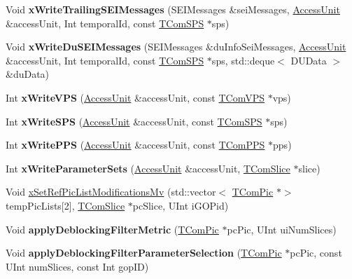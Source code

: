 \begin{DoxyCompactItemize}
Void {\bfseries x\+Write\+Trailing\+S\+E\+I\+Messages} (S\+E\+I\+Messages \&sei\+Messages, \hyperlink{class_access_unit}{Access\+Unit} \&access\+Unit, Int temporal\+Id, const \hyperlink{class_t_com_s_p_s}{T\+Com\+S\+PS} $\ast$sps)
\item 
\mbox{\label{class_t_enc_g_o_p_a90a6aaa451ba2bed29b105229129c70c}} 
Void {\bfseries x\+Write\+Du\+S\+E\+I\+Messages} (S\+E\+I\+Messages \&du\+Info\+Sei\+Messages, \hyperlink{class_access_unit}{Access\+Unit} \&access\+Unit, Int temporal\+Id, const \hyperlink{class_t_com_s_p_s}{T\+Com\+S\+PS} $\ast$sps, std\+::deque$<$ D\+U\+Data $>$ \&du\+Data)
\item 
\mbox{\label{class_t_enc_g_o_p_a5130412b4847fec3413306c5d1bf6554}} 
Int {\bfseries x\+Write\+V\+PS} (\hyperlink{class_access_unit}{Access\+Unit} \&access\+Unit, const \hyperlink{class_t_com_v_p_s}{T\+Com\+V\+PS} $\ast$vps)
\item 
\mbox{\label{class_t_enc_g_o_p_a806897a6da35aa7dc90bcd2288044845}} 
Int {\bfseries x\+Write\+S\+PS} (\hyperlink{class_access_unit}{Access\+Unit} \&access\+Unit, const \hyperlink{class_t_com_s_p_s}{T\+Com\+S\+PS} $\ast$sps)
\item 
\mbox{\label{class_t_enc_g_o_p_a738b979ca624ff502e19d77181a933be}} 
Int {\bfseries x\+Write\+P\+PS} (\hyperlink{class_access_unit}{Access\+Unit} \&access\+Unit, const \hyperlink{class_t_com_p_p_s}{T\+Com\+P\+PS} $\ast$pps)
\item 
\mbox{\label{class_t_enc_g_o_p_ae7de52833a142454d32187ed7bf80b3c}} 
Int {\bfseries x\+Write\+Parameter\+Sets} (\hyperlink{class_access_unit}{Access\+Unit} \&access\+Unit, \hyperlink{class_t_com_slice}{T\+Com\+Slice} $\ast$slice)
\item 
Void \hyperlink{class_t_enc_g_o_p_acdf2285353665293d998ded09e121518}{x\+Set\+Ref\+Pic\+List\+Modifications\+Mv} (std\+::vector$<$ \hyperlink{class_t_com_pic}{T\+Com\+Pic} $\ast$$>$ temp\+Pic\+Lists\mbox{[}2\mbox{]}, \hyperlink{class_t_com_slice}{T\+Com\+Slice} $\ast$pc\+Slice, U\+Int i\+G\+O\+Pid)
\item 
\mbox{\label{class_t_enc_g_o_p_a5f065fcf6c5be1954c9dc8ddadf89b71}} 
Void {\bfseries apply\+Deblocking\+Filter\+Metric} (\hyperlink{class_t_com_pic}{T\+Com\+Pic} $\ast$pc\+Pic, U\+Int ui\+Num\+Slices)
\item 
\mbox{\label{class_t_enc_g_o_p_aaf09a236ed68449451dd0ef6ee2db805}} 
Void {\bfseries apply\+Deblocking\+Filter\+Parameter\+Selection} (\hyperlink{class_t_com_pic}{T\+Com\+Pic} $\ast$pc\+Pic, const U\+Int num\+Slices, const Int gop\+ID)
\end{DoxyCompactItemize}


